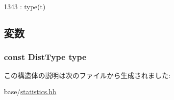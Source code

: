 \begin{DoxyCode}
1343 : type(t) {}
\end{DoxyCode}


\subsection{変数}
\hypertarget{structStats_1_1DistParams_a69cb9e832da846d9f936d26afe49b6dc}{
\subsubsection[{type}]{\setlength{\rightskip}{0pt plus 5cm}const {\bf DistType} {\bf type}}}
\label{structStats_1_1DistParams_a69cb9e832da846d9f936d26afe49b6dc}


この構造体の説明は次のファイルから生成されました:\begin{DoxyCompactItemize}
\item 
base/\hyperlink{statistics_8hh}{statistics.hh}\end{DoxyCompactItemize}
